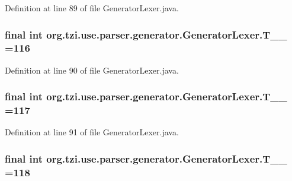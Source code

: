 Definition at line 89 of file Generator\-Lexer.\-java.

\hypertarget{classorg_1_1tzi_1_1use_1_1parser_1_1generator_1_1_generator_lexer_aafc31c1d01ab20c90ef6c613b286ab58}{
\subsubsection[{T\-\_\-\-\_\-116}]{\setlength{\rightskip}{0pt plus 5cm}final int org.\-tzi.\-use.\-parser.\-generator.\-Generator\-Lexer.\-T\-\_\-\-\_ =116\hspace{0.3cm}{\ttfamily [static]}}}\label{classorg_1_1tzi_1_1use_1_1parser_1_1generator_1_1_generator_lexer_aafc31c1d01ab20c90ef6c613b286ab58}


Definition at line 90 of file Generator\-Lexer.\-java.

\hypertarget{classorg_1_1tzi_1_1use_1_1parser_1_1generator_1_1_generator_lexer_a437025ac9cc4cd037dd50cf0eaa0efbb}{
\subsubsection[{T\-\_\-\-\_\-117}]{\setlength{\rightskip}{0pt plus 5cm}final int org.\-tzi.\-use.\-parser.\-generator.\-Generator\-Lexer.\-T\-\_\-\-\_ =117\hspace{0.3cm}{\ttfamily [static]}}}\label{classorg_1_1tzi_1_1use_1_1parser_1_1generator_1_1_generator_lexer_a437025ac9cc4cd037dd50cf0eaa0efbb}


Definition at line 91 of file Generator\-Lexer.\-java.

\hypertarget{classorg_1_1tzi_1_1use_1_1parser_1_1generator_1_1_generator_lexer_a9a6e61647d2508e381f2731795785541}{
\subsubsection[{T\-\_\-\-\_\-118}]{\setlength{\rightskip}{0pt plus 5cm}final int org.\-tzi.\-use.\-parser.\-generator.\-Generator\-Lexer.\-T\-\_\-\-\_ =118\hspace{0.3cm}{\ttfamily [static]}}}\label{classorg_1_1tzi_1_1use_1_1parser_1_1generator_1_1_generator_lexer_a9a6e61647d2508e381f2731795785541}


